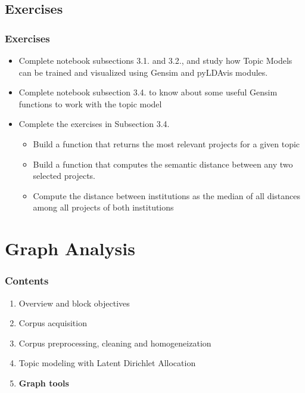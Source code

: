 \documentclass{beamer}
\begin{document}
\subsection{Exercises}

\begin{frame}

    \frametitle{Exercises}

	\begin{exampleblock}{}
		\begin{itemize}
		\item Complete notebook subsections 3.1. and 3.2., and study how Topic Models can be trained and visualized using Gensim and pyLDAvis modules.
		\item Complete notebook subsection 3.4. to know about some useful Gensim functions to work with the topic model
		\item Complete the exercises in Subsection 3.4.
		\begin{itemize}
			\item Build a function that returns the most relevant projects for a given topic
			\item Build a function that computes the semantic distance between any two selected projects.
			\item Compute the distance between institutions as the median of all distances among all projects of both institutions
		\end{itemize}
	\end{itemize}
	\end{exampleblock}
	
\end{frame}


\section{Graph Analysis}

\begin{frame}

    \frametitle{Contents}

	\large

    \begin{enumerate}
  
    	\item Overview and block objectives
    	\item Corpus acquisition
    	\item Corpus preprocessing, cleaning and homogeneization
    	\item Topic modeling with Latent Dirichlet Allocation
    	\item {\bf \color{blue}Graph tools}
    
    \end{enumerate}

\end{frame}
\end{document}
